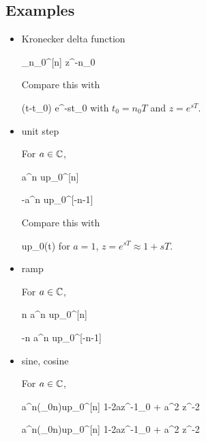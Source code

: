 \subsection{Examples}
\begin{itemize} 

\item Kronecker delta function

\beq
\delta_{n_0}^{[n]}
\maparrow{\calz}
z^{-n_0}
\eeq

Compare this with

\beq
\delta(t-t_0)
\maparrow{\call} e^{-st_0}
\eeq
with $t_0=n_0T$
and $z=e^{sT}$.


\item unit step

For $a\in{ \mathbb{C}}$,

\beq
a^n up_0^{[n]}
\maparrow{\calz}
\quad {}
\eeq


\beq
-a^n up_0^{[-n-1]}
\maparrow{\calz}
\quad {}
\eeq

Compare this with

\beq
up_0(t)
\maparrow{\call}
\quad {}
\eeq
for $a=1$, $z=e^{sT}\approx 1 + sT$.


\item ramp

For $a\in{ \mathbb{C}}$,

\beq
n a^n up_0^{[n]}
\maparrow{\calz}
\quad {}
\eeq


\beq
-n a^n up_0^{[-n-1]}
\maparrow{\calz}
\quad {}
\eeq

\item sine, cosine

For $a\in{ \mathbb{C}}$,

\beq
a^n\sin(\omega_0n)up_0^{[n]}
\maparrow{\calz}
{1-2az^{-1}\cos\omega_0 + a^2 z^{-2}}
\eeq

\beq
a^n\cos(\omega_0n)up_0^{[n]}
\maparrow{\calz}
{1-2az^{-1}\cos\omega_0 + a^2 z^{-2}}
\eeq
\end{itemize}

